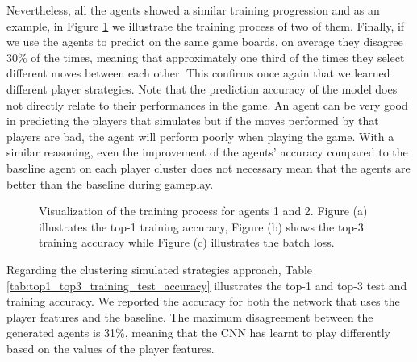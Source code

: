 Nevertheless, all the agents showed a similar training progression and as an example, in Figure \ref{fig:nn_train} we illustrate the training process of two of them.  Finally, if we use the agents to predict on the same game boards, on average they disagree 30\% of the times, meaning that approximately one third of the times they select different moves between each other. This confirms once again that we learned different player strategies.
Note that the prediction accuracy of the model does not directly relate to their performances in the game. 
An agent can be very good in predicting the players that simulates but if the moves performed by that players are bad, the agent will perform poorly when playing the game. With a similar reasoning, even the improvement of the agents' accuracy compared to the baseline agent on each player cluster does not necessary mean that the agents are better than the baseline during gameplay. 
\begin{figure}[h]     
\centering
    \subfloat[]{%
    
    \label{fig:train_acc_1}
    }
    \subfloat[]{%
    
    \label{fig:train_acc_3}
    }
    \subfloat[]{%
    
    \label{fig:train_batch_loss}
    }
    \caption{Visualization of the training process for agents 1 and 2. Figure (a) illustrates the top-1 training accuracy, Figure (b) shows the top-3 training accuracy while Figure (c) illustrates the batch loss. }
    \label{fig:nn_train}
\end{figure}

Regarding the clustering simulated strategies approach, Table \ref{tab:top1_top3_training_test_accuracy} illustrates the top-1 and top-3 test and training accuracy. We reported the accuracy for both the network that uses the player features and the baseline. 
The maximum disagreement between the generated agents is 31\%, meaning that the \acs{CNN} has learnt to play differently based on the values of the player features.

